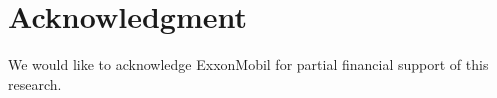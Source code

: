 \section{Acknowledgment}
We would like to acknowledge ExxonMobil for partial financial support of this research.
